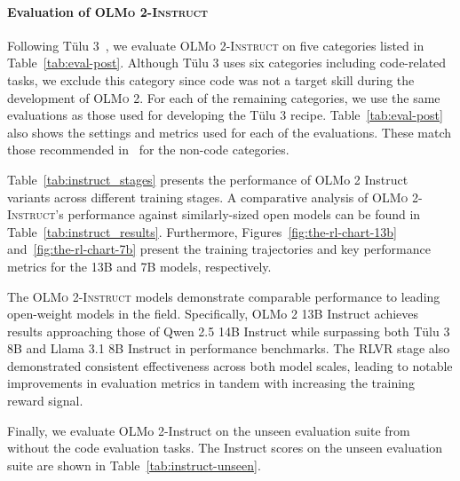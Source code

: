 \documentclass[table]{ai2style/ai2}
\newcommand{\tulu}{T\"ulu 3\xspace}
\newcommand{\olmotoo}{\textsc{OLMo 2}\xspace}
\newcommand{\olmotooinstruct}{\textsc{OLMo 2-Instruct}\xspace}
\begin{document}
\paragraph{Evaluation of \olmotooinstruct} 
Following \tulu~\citep{lambert2024tulu3}, we evaluate \olmotooinstruct on five categories listed in Table~\ref{tab:eval-post}. 
Although \tulu uses six categories including code-related tasks, we exclude this category since code was not a target skill during the development of \olmotoo. 
For each of the remaining categories, we use the same evaluations as those used for developing the \tulu recipe.
Table~\ref{tab:eval-post} also shows the settings and metrics used for each of the evaluations. These match those recommended in~\citet{lambert2024tulu3} for the non-code categories.

Table~\ref{tab:instruct_stages} presents the performance of OLMo 2 Instruct variants across different training stages. 
A comparative analysis of \olmotooinstruct's performance against similarly-sized open models can be found in Table~\ref{tab:instruct_results}. Furthermore, Figures~\ref{fig:the-rl-chart-13b} and~\ref{fig:the-rl-chart-7b} present the training trajectories and key performance metrics for the 13B and 7B models, respectively. 

The \olmotooinstruct models demonstrate comparable performance to leading open-weight models in the field. Specifically, OLMo 2 13B Instruct achieves results approaching those of Qwen 2.5 14B Instruct while surpassing both \tulu 8B and Llama 3.1 8B Instruct in performance benchmarks. The RLVR stage also demonstrated consistent effectiveness across both model scales, leading to notable improvements in evaluation metrics in tandem with increasing the training reward signal.

Finally, we evaluate OLMo 2-Instruct on the unseen evaluation suite from \citet{lambert2024tulu3} without the code evaluation tasks. The Instruct scores on the unseen evaluation suite are shown in Table~\ref{tab:instruct-unseen}.
\end{document}
